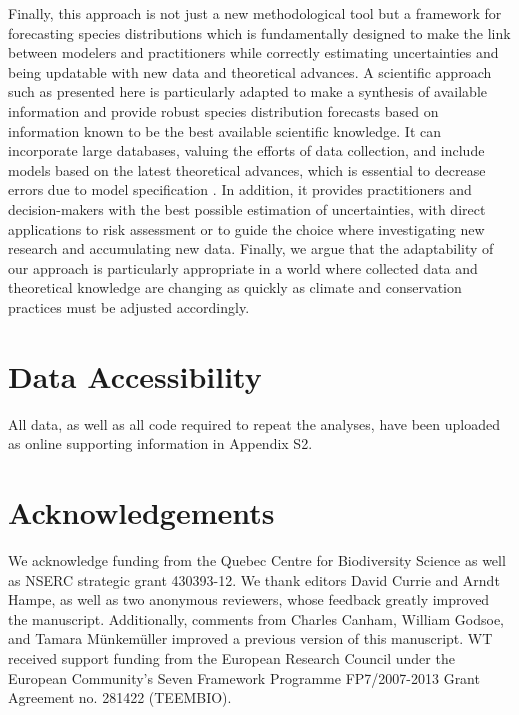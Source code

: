 \documentclass[11pt]{article}
\begin{document}
Finally, this approach is not just a new methodological tool but a framework for forecasting species distributions which is fundamentally designed to make the link between modelers and practitioners while correctly estimating uncertainties and being updatable with new data and theoretical advances. 
A scientific approach such as presented here is particularly adapted to make a synthesis of available information and provide robust species distribution forecasts based on information known to be the best available scientific knowledge. 
It can incorporate large databases, valuing the efforts of data collection, and include models based on the latest theoretical advances, which is essential to decrease errors due to model specification \citep{Austin2007}. 
In addition, it provides practitioners and decision-makers with the best possible estimation of uncertainties, with direct applications to risk assessment or to guide the choice where investigating new research and accumulating new data. 
Finally, we argue that the adaptability of our approach is particularly appropriate in a world where collected data and theoretical knowledge are changing as quickly as climate and conservation practices must be adjusted accordingly.

\section*{Data Accessibility}
All data, as well as all code required to repeat the analyses, have been uploaded as online supporting information in Appendix S2.


\section*{Acknowledgements}
We acknowledge funding from the Quebec Centre for Biodiversity Science as well as NSERC strategic grant 430393-12. We thank editors David Currie and Arndt Hampe, as well as two anonymous reviewers, whose feedback greatly improved the manuscript. Additionally, comments from Charles Canham, William Godsoe, and Tamara Münkemüller improved a previous version of this manuscript. WT received support funding from the European Research Council under the European Community's Seven Framework Programme FP7/2007-2013 Grant Agreement no. 281422 (TEEMBIO). 

\nolinenumbers

%
%
\end{document}
